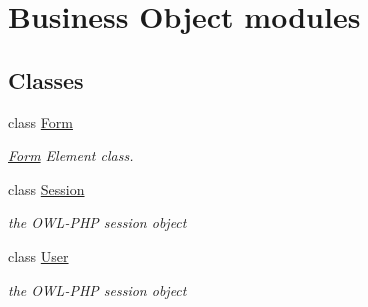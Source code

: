 \hypertarget{group__OWL__BO__LAYER}{
\section{Business Object modules}
\label{group__OWL__BO__LAYER}
}
\subsection*{Classes}
\begin{CompactItemize}
\item 
class \hyperlink{classForm}{Form}
\begin{CompactList}\small\item\em \hyperlink{classForm}{Form} Element class. \item\end{CompactList}\item 
class \hyperlink{classSession}{Session}
\begin{CompactList}\small\item\em the OWL-PHP session object \item\end{CompactList}\item 
class \hyperlink{classUser}{User}
\begin{CompactList}\small\item\em the OWL-PHP session object \item\end{CompactList}\end{CompactItemize}
